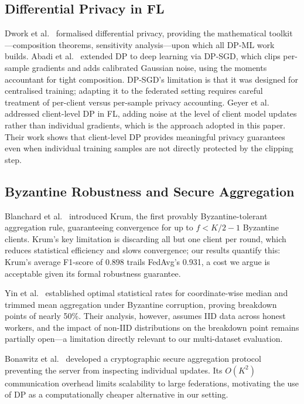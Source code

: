 \documentclass[conference]{IEEEtran}
\begin{document}
\subsection{Differential Privacy in FL}

Dwork et al.~\cite{dwork2006} formalised differential privacy,
providing the mathematical toolkit---composition theorems, sensitivity
analysis---upon which all DP-ML work builds.
Abadi et al.~\cite{abadi2016} extended DP to deep learning via
DP-SGD, which clips per-sample gradients and adds calibrated Gaussian
noise, using the moments accountant for tight composition.
DP-SGD's limitation is that it was designed for centralised training;
adapting it to the federated setting requires careful treatment of
per-client versus per-sample privacy accounting.
Geyer et al.~\cite{geyer2017} addressed client-level DP in FL,
adding noise at the level of client model updates rather than
individual gradients, which is the approach adopted in this paper.
Their work shows that client-level DP provides meaningful privacy
guarantees even when individual training samples are not directly
protected by the clipping step.

\subsection{Byzantine Robustness and Secure Aggregation}

Blanchard et al.~\cite{blanchard2017} introduced Krum, the first
provably Byzantine-tolerant aggregation rule, guaranteeing convergence
for up to $f < K/2 - 1$ Byzantine clients.
Krum's key limitation is discarding all but one client per round,
which reduces statistical efficiency and slows convergence;
our results quantify this: Krum's average F1-score of 0.898 trails
FedAvg's 0.931, a cost we argue is acceptable given its formal
robustness guarantee.

Yin et al.~\cite{yin2018} established optimal statistical rates for
coordinate-wise median and trimmed mean aggregation under Byzantine
corruption, proving breakdown points of nearly 50\%.
Their analysis, however, assumes IID data across honest workers, and
the impact of non-IID distributions on the breakdown point remains
partially open---a limitation directly relevant to our multi-dataset
evaluation.

Bonawitz et al.~\cite{bonawitz2017} developed a cryptographic secure
aggregation protocol preventing the server from inspecting individual
updates.
Its $O(K^2)$ communication overhead limits scalability to large
federations, motivating the use of DP as a computationally cheaper
alternative in our setting.
\end{document}
